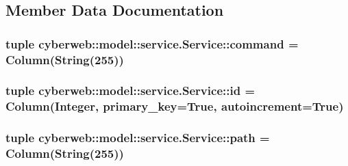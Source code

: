 \subsection{\-Member \-Data \-Documentation}
\hypertarget{classcyberweb_1_1model_1_1service_1_1_service_a929b0afb18753373bf9844d1ed384109}{
\subsubsection[{command}]{\setlength{\rightskip}{0pt plus 5cm}tuple {\bf cyberweb\-::model\-::service.\-Service\-::command} = \-Column(\-String(255))}}\label{classcyberweb_1_1model_1_1service_1_1_service_a929b0afb18753373bf9844d1ed384109}
\hypertarget{classcyberweb_1_1model_1_1service_1_1_service_a95b33517acd64b8c8a30cca63ebedac2}{
\subsubsection[{command}]{}}\label{classcyberweb_1_1model_1_1service_1_1_service_a95b33517acd64b8c8a30cca63ebedac2}
\hypertarget{classcyberweb_1_1model_1_1service_1_1_service_a2a0ae61b7f34259eb085f86165c6559e}{
\subsubsection[{id}]{\setlength{\rightskip}{0pt plus 5cm}tuple {\bf cyberweb\-::model\-::service.\-Service\-::id} = \-Column(\-Integer, primary\-\_\-key=\-True, autoincrement=\-True)}}\label{classcyberweb_1_1model_1_1service_1_1_service_a2a0ae61b7f34259eb085f86165c6559e}
\hypertarget{classcyberweb_1_1model_1_1service_1_1_service_ac2ab6ce82d9e144021f69b6f5fd8b07a}{
\subsubsection[{path}]{\setlength{\rightskip}{0pt plus 5cm}tuple {\bf cyberweb\-::model\-::service.\-Service\-::path} = \-Column(\-String(255))}}\label{classcyberweb_1_1model_1_1service_1_1_service_ac2ab6ce82d9e144021f69b6f5fd8b07a}
